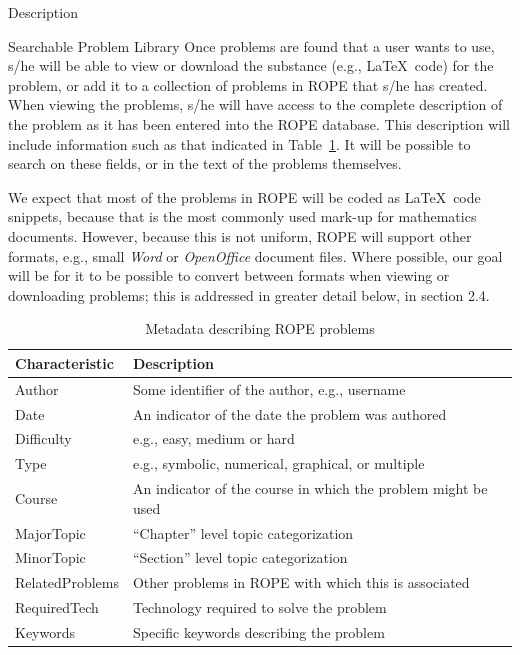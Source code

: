 \documentclass[11pt]{article}
\begin{document}
\begin{section}{Description}
\begin{subsection}{Searchable Problem Library}
Once problems are found that a user wants to use, s/he will be able to
view or download the substance (e.g., \LaTeX\ code) for the problem, or
add it to a collection of problems in ROPE that s/he has created.  When
viewing the problems, s/he will have access to the complete description of
the problem as it has been entered into the ROPE database.  This
description will include information such as that indicated in
Table~\ref{metadata}.  It will be possible to search on these fields, or
in the text of the problems themselves.

We expect that most of the problems in ROPE will be coded as \LaTeX\ code
snippets, because that is the most commonly used mark-up for mathematics
documents.  However, because this is not uniform, ROPE will
support other formats, e.g., small \emph{Word} or \emph{OpenOffice}
document files.  Where possible, our goal will be for it to be possible to
convert between formats when viewing or downloading problems; this is
addressed in greater detail below, in section 2.4.

\begin{table}
\begin{center}
\begin{tabular}{|l|l|}
  \hline
  \textbf{Characteristic} & \textbf{Description} \\
  \hline
  Author & Some identifier of the author, e.g., username \\
  Date   & An indicator of the date the problem was authored \\
  Difficulty & e.g., easy, medium or hard \\
  Type & e.g., symbolic, numerical, graphical, or multiple \\
  Course & An indicator of the course in which the problem might be used \\
  MajorTopic & ``Chapter'' level topic categorization \\
  MinorTopic & ``Section'' level topic categorization \\
  RelatedProblems & Other problems in ROPE with which this is associated \\
  RequiredTech & Technology required to solve the problem \\
  Keywords & Specific keywords describing the problem \\
  \hline
\end{tabular}
\end{center}
\caption{Metadata describing ROPE problems}
\label{metadata}
\end{table}



\end{subsection}
\end{section}
\end{document}
